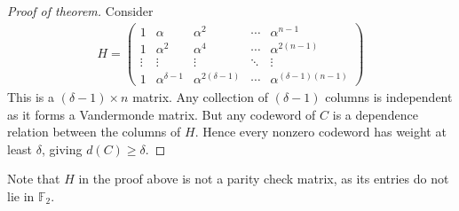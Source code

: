 \begin{proof}[Proof of theorem]
    Consider
    \begin{align*}
        H = \begin{pmatrix}
            1 & \alpha & \alpha^2 & \cdots & \alpha^{n-1} \\
            1 & \alpha^2 & \alpha^4 & \cdots & \alpha^{2(n-1)} \\
            \vdots & \vdots & \vdots & \ddots & \vdots \\
            1 & \alpha^{\delta - 1} & \alpha^{2(\delta - 1)} & \cdots & \alpha^{(\delta - 1)(n-1)}
        \end{pmatrix}
    \end{align*}
    This is a $(\delta - 1) \times n$ matrix.
    Any collection of $(\delta - 1)$ columns is independent as it forms a Vandermonde matrix.
    But any codeword of $C$ is a dependence relation between the columns of $H$.
    Hence every nonzero codeword has weight at least $\delta$, giving $d(C) \geq \delta$.
\end{proof}
Note that $H$ in the proof above is not a parity check matrix, as its entries do not lie in $\mathbb F_2$.

